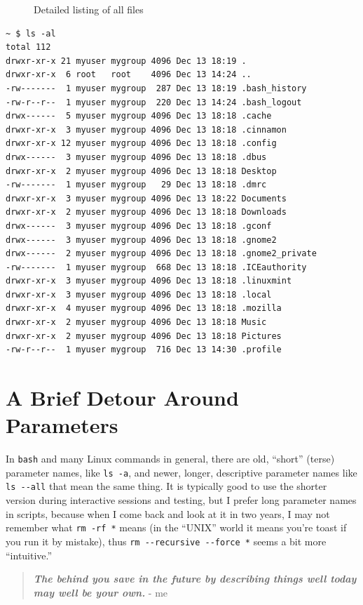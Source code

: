 \documentclass[10pt,]{book}
\numberwithin{figure}{chapter}
\DeclareRobustCommand{\drcap}[1]{\begin{figure}[H]\caption{#1}\end{figure}}
\DeclareRobustCommand{\drcmd}[1]{\index{Commands!#1}}
\begin{document}
\drcap{Detailed listing of all files}

\begin{verbatim}
~ $ ls -al
total 112
drwxr-xr-x 21 myuser mygroup 4096 Dec 13 18:19 .
drwxr-xr-x  6 root   root    4096 Dec 13 14:24 ..
-rw-------  1 myuser mygroup  287 Dec 13 18:19 .bash_history
-rw-r--r--  1 myuser mygroup  220 Dec 13 14:24 .bash_logout
drwx------  5 myuser mygroup 4096 Dec 13 18:18 .cache
drwxr-xr-x  3 myuser mygroup 4096 Dec 13 18:18 .cinnamon
drwxr-xr-x 12 myuser mygroup 4096 Dec 13 18:18 .config
drwx------  3 myuser mygroup 4096 Dec 13 18:18 .dbus
drwxr-xr-x  2 myuser mygroup 4096 Dec 13 18:18 Desktop
-rw-------  1 myuser mygroup   29 Dec 13 18:18 .dmrc
drwxr-xr-x  3 myuser mygroup 4096 Dec 13 18:22 Documents
drwxr-xr-x  2 myuser mygroup 4096 Dec 13 18:18 Downloads
drwx------  3 myuser mygroup 4096 Dec 13 18:18 .gconf
drwx------  3 myuser mygroup 4096 Dec 13 18:18 .gnome2
drwx------  2 myuser mygroup 4096 Dec 13 18:18 .gnome2_private
-rw-------  1 myuser mygroup  668 Dec 13 18:18 .ICEauthority
drwxr-xr-x  3 myuser mygroup 4096 Dec 13 18:18 .linuxmint
drwxr-xr-x  3 myuser mygroup 4096 Dec 13 18:18 .local
drwxr-xr-x  4 myuser mygroup 4096 Dec 13 18:18 .mozilla
drwxr-xr-x  2 myuser mygroup 4096 Dec 13 18:18 Music
drwxr-xr-x  2 myuser mygroup 4096 Dec 13 18:18 Pictures
-rw-r--r--  1 myuser mygroup  716 Dec 13 14:30 .profile
\end{verbatim}

\section{A Brief Detour Around
Parameters}\label{a-brief-detour-around-parameters}

In \texttt{bash} and many Linux commands in general, there are old,
``short'' (terse) parameter names, like \texttt{ls -a}, and newer,
longer, descriptive parameter names like \texttt{ls -{}-all} that mean
the same thing. It is typically good to use the shorter version during
interactive sessions and testing, but I prefer long parameter names in
scripts, because when I come back and look at it in two years, I may not
remember what \texttt{rm -rf *}\drcmd{rm} means (in the ``UNIX'' world
it means you're toast if you run it by mistake), thus
\texttt{rm -{}-recursive -{}-force *} seems a bit more ``intuitive.''

\begin{quote}
\textbf{\emph{The behind you save in the future by describing things
well today may well be your own.}} - me
\end{quote}
\end{document}
